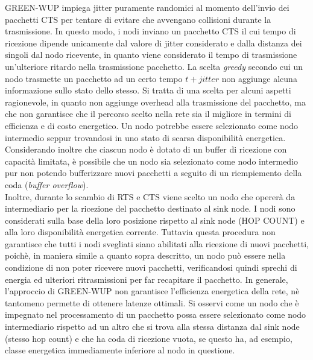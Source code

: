 \documentclass{report}
\begin{document}
GREEN-WUP impiega jitter puramente randomici al momento dell'invio dei pacchetti CTS per tentare di evitare che avvengano collisioni durante
la trasmissione. In questo modo, i nodi inviano un pacchetto CTS il cui tempo di ricezione dipende unicamente dal valore di jitter
considerato e dalla distanza dei singoli dal nodo ricevente, in quanto viene considerato il tempo di trasmissione un'ulteriore ritardo nella
trasmissione pacchetto. La scelta \emph{greedy} secondo cui un nodo trasmette un pacchetto ad un certo tempo $t+jitter$ non aggiunge alcuna
informazione sullo stato dello stesso. Si tratta di una scelta per alcuni aspetti ragionevole, in quanto non aggiunge overhead alla trasmissione
del pacchetto, ma che non garantisce che il percorso scelto nella rete sia il migliore in termini di efficienza e di costo energetico. Un nodo
potrebbe essere selezionato come nodo intermedio seppur trovandosi in uno stato di scarsa disponibilità energetica. Considerando inoltre che
ciascun nodo è dotato di un buffer di ricezione con capacità limitata, è possibile che un nodo sia selezionato come nodo intermedio pur non
potendo bufferizzare nuovi pacchetti a seguito di un riempiemento della coda (\emph{buffer overflow}).\\

Inoltre, durante lo scambio di RTS e CTS viene scelto un nodo che opererà da intermediario per la ricezione del pacchetto destinato
al sink node. I nodi sono considerati sulla base della loro posizione rispetto al sink node (HOP COUNT) e alla loro disponibilità energetica corrente.
Tuttavia questa procedura non garantisce che tutti i nodi svegliati siano abilitati alla ricezione di nuovi pacchetti, poichè, in maniera simile a
quanto sopra descritto, un nodo può essere nella condizione di non poter ricevere nuovi pacchetti, verificandosi quindi sprechi di energia ed
ulteriori ritrasmissioni per far recapitare il pacchetto. In generale, l'approccio di GREEN-WUP non garantisce l'efficienza energetica della rete,
nè tantomeno permette di ottenere latenze ottimali. Si osservi come un nodo che è impegnato nel processamento di un pacchetto possa essere selezionato
come nodo intermediario rispetto ad un altro che si trova alla stessa distanza dal sink node (stesso hop count) e che ha coda di ricezione vuota, se questo
ha, ad esempio, classe energetica immediamente inferiore al nodo in questione. \\
\end{document}

